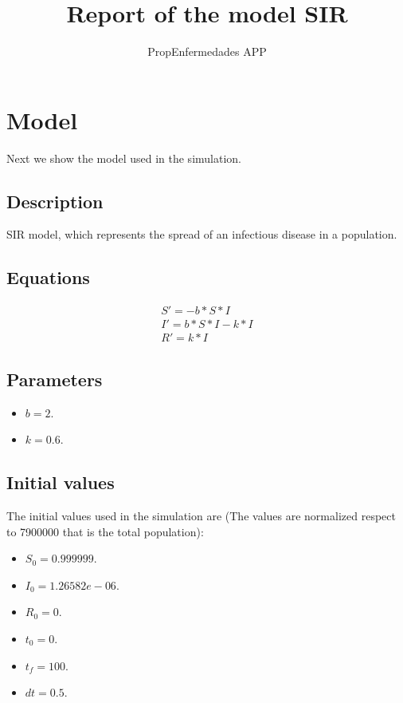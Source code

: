 \documentclass{article}
\title{Report of the model SIR}
\author{PropEnfermedades APP}
\date{}
\begin{document}
\maketitle
\section{Model}
Next we show the model used in the simulation.
\subsection*{Description}
SIR model, which represents the spread of an infectious disease in a population.
\subsection*{Equations}
\begin{equation}
\begin{split}
S' = -b * S * I \\ I' = b * S * I - k * I \\ R' = k * I
\end{split}
\end{equation}
\subsection*{Parameters}
\begin{itemize}
\item $b = 2$. 
\item $k = 0.6$. 
\end{itemize}
\subsection*{Initial values}
The initial values used in the simulation are (The values are normalized respect to 7900000 that is the total population):
\begin{itemize}
\item $S_0 = 0.999999$. 
\item $I_0 = 1.26582e-06$. 
\item $R_0 = 0$. 
\item $t_0 = 0$. 
\item $t_f = 100$. 
\item $dt = 0.5$. 
\end{itemize}
\end{document}
